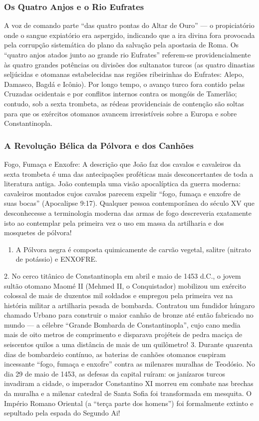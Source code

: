 \documentclass[11pt,a4paper,openany]{book}
\begin{document}
\subsubsection*{Os Quatro Anjos e o Rio Eufrates}
A voz de comando parte ``das quatro pontas do Altar de Ouro'' — o propiciatório onde o sangue expiatório era aspergido, indicando que a ira divina fora provocada pela corrupção sistemática do plano da salvação pela apostasia de Roma.
Os ``quatro anjos atados junto ao grande rio Eufrates'' referem-se providencialmente às quatro grandes potências ou divisões dos sultanatos turcos (as quatro dinastias seljúcidas e otomanas estabelecidas nas regiões ribeirinhas do Eufrates: Alepo, Damasco, Bagdá e Icônio). Por longo tempo, o avanço turco fora contido pelas Cruzadas ocidentais e por conflitos internos contra os mongóis de Tamerlão; contudo, sob a sexta trombeta, as rédeas providenciais de contenção são soltas para que os exércitos otomanos avancem irresistíveis sobre a Europa e sobre Constantinopla.


\subsubsection*{A Revolução Bélica da Pólvora e dos Canhões}
Fogo, Fumaça e Enxofre:
A descrição que João faz dos cavalos e cavaleiros da sexta trombeta é uma das antecipações proféticas mais desconcertantes de toda a literatura antiga.
João contempla uma visão apocalíptica da guerra moderna: cavaleiros montados cujos cavalos parecem expelir ``fogo, fumaça e enxofre de suas bocas'' (Apocalipse 9:17).
Qualquer pessoa contemporânea do século XV que desconhecesse a terminologia moderna das armas de fogo descreveria exatamente isto ao contemplar pela primeira vez o uso em massa da artilharia e dos mosquetes de pólvora!
\begin{enumerate}
  \item A Pólvora negra é composta quimicamente de carvão vegetal, salitre (nitrato de potássio) e ENXOFRE.
\end{enumerate}

2. No cerco titânico de Constantinopla em abril e maio de 1453 d.C., o jovem sultão otomano Maomé II (Mehmed II, o Conquistador) mobilizou um exército colossal de mais de duzentos mil soldados e empregou pela primeira vez na história militar a artilharia pesada de bombarda. Contratou um fundidor húngaro chamado Urbano para construir o maior canhão de bronze até então fabricado no mundo — a célebre ``Grande Bombarda de Constantinopla'', cujo cano media mais de oito metros de comprimento e disparava projéteis de pedra maciça de seiscentos quilos a uma distância de mais de um quilômetro!
3. Durante quarenta dias de bombardeio contínuo, as baterias de canhões otomanos cuspiram incessante ``fogo, fumaça e enxofre'' contra as milenares muralhas de Teodósio. No dia 29 de maio de 1453, as defesas da capital ruíram: os janízaros turcos invadiram a cidade, o imperador Constantino XI morreu em combate nas brechas da muralha e a milenar catedral de Santa Sofia foi transformada em mesquita. O Império Romano Oriental (a ``terça parte dos homens'') foi formalmente extinto e sepultado pela espada do Segundo Ai!
\end{document}
